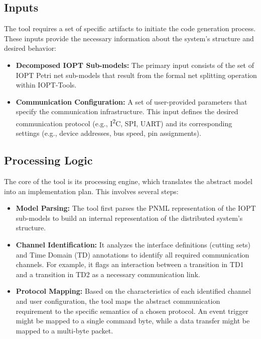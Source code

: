 \subsection{Inputs}
The tool requires a set of specific artifacts to initiate the code generation process. These inputs provide the necessary information about the system's structure and desired behavior:
\begin{itemize}
    \item \textbf{Decomposed IOPT Sub-models:} The primary input consists of the set of IOPT Petri net sub-models that result from the formal net splitting operation within IOPT-Tools.
    \item \textbf{Communication Configuration:} A set of user-provided parameters that specify the communication infrastructure. This input defines the desired communication protocol (e.g., I\textsuperscript{2}C, SPI, UART) and its corresponding settings (e.g., device addresses, bus speed, pin assignments).
\end{itemize}

\subsection{Processing Logic}
The core of the tool is its processing engine, which translates the abstract model into an implementation plan. This involves several steps:
\begin{itemize}
    \item \textbf{Model Parsing:} The tool first parses the PNML representation of the IOPT sub-models to build an internal representation of the distributed system's structure.
    \item \textbf{Channel Identification:} It analyzes the interface definitions (cutting sets) and Time Domain (TD) annotations to identify all required communication channels. For example, it flags an interaction between a transition in TD1 and a transition in TD2 as a necessary communication link.
    \item \textbf{Protocol Mapping:} Based on the characteristics of each identified channel and user configuration, the tool maps the abstract communication requirement to the specific semantics of a chosen protocol. An event trigger might be mapped to a single command byte, while a data transfer might be mapped to a multi-byte packet.
\end{itemize}

